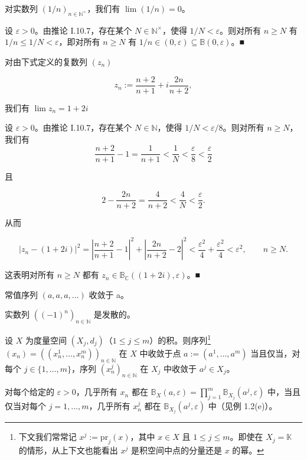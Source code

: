 \begin{example}

\begin{items}
\item

对实数列  $ (1/n)_{n \in \mathbb{N}^\times} $，我们有  $ \lim(1/n) = 0 $。

\proofhead
设  $ \varepsilon > 0 $。由推论 I.10.7，存在某个  $ N \in \mathbb{N}^\times $，使得  $ 1/N < \varepsilon $。则对所有  $ n \geq N $ 有  $ 1/n \leq 1/N < \varepsilon $，即对所有  $ n \geq N $ 有  $ 1/n \in (0, \varepsilon) \subseteq \mathbb{B}(0, \varepsilon) $。■
\item

对由下式定义的复数列  $ (z_{n}) $

\[
z_{n}:=\frac{n+2}{n+1}+i\frac{2n}{n+2},
\]

我们有  $ \lim z_{n}=1+2i $

\proofhead
设  $ \varepsilon > 0 $。由推论 I.10.7，存在某个  $ N \in \mathbb{N} $，使得  $ 1/N < \varepsilon/8 $。则对所有  $ n \geq N $，我们有
\[
\frac{n+2}{n+1}-1=\frac{1}{n+1}<\frac{1}{N}<\frac{\varepsilon}{8}<\frac{\varepsilon}{2}
\]

且

\[
2-\frac{2n}{n+2}=\frac{4}{n+2}<\frac{4}{N}<\frac{\varepsilon}{2}.
\]

从而

\[
\left|z_{n}-(1+2i)\right|^{2}=\left|\frac{n+2}{n+1}-1\right|^{2}+\left|\frac{2n}{n+2}-2\right|^{2}<\frac{\varepsilon^{2}}{4}+\frac{\varepsilon^{2}}{4}<\varepsilon^{2},\qquad n\geq N.
\]

这表明对所有  $ n \geq N $ 都有  $ z_n \in \mathbb{B}_{\mathbb{C}}((1 + 2i), \varepsilon) $。■

\item

常值序列  $ (a, a, a, \ldots) $ 收敛于 a。

\item

实数列  $ ((-1)^n)_{n \in \mathbb{N}} $ 是发散的。

\item

设 $X$ 为度量空间 $(X_j, d_j)$（$1 \leq j \leq m$）的积。则序列\footnote{下文我们常常记 $x^{j}:=\mathrm{pr}_{j}(x)$，其中 $x\in X$ 且 $1\leq j\leq m$。即使在 $X_{j}=\mathbb K$ 的情形，从上下文也能看出 $x^{j}$ 是积空间中点的分量还是 $x$ 的幂。}$(x_n) = \left((x_n^1, \ldots, x_n^m)\right)_{n \in \mathbb{N}}$ 在 $X$ 中收敛于点 $a := (a^1, \ldots, a^m)$ 当且仅当，对每个 $j \in \{1, \ldots, m\}$，序列 $(x_n^j)_{n \in \mathbb{N}}$ 在 $X_j$ 中收敛于 $a^j \in X_j$。

\proofhead
对每个给定的 $\varepsilon > 0$，几乎所有 $x_n$ 都在 $\mathbb{B}_X(a, \varepsilon) = \prod_{j=1}^m \mathbb{B}_{X_j}(a^j, \varepsilon)$ 中，当且仅当对每个 $j = 1, \ldots, m$，几乎所有 $x_n^j$ 都在 $\mathbb{B}_{X_j}(a^j, \varepsilon)$ 中（见例 1.2(e)）。
\end{items}

\end{example}

